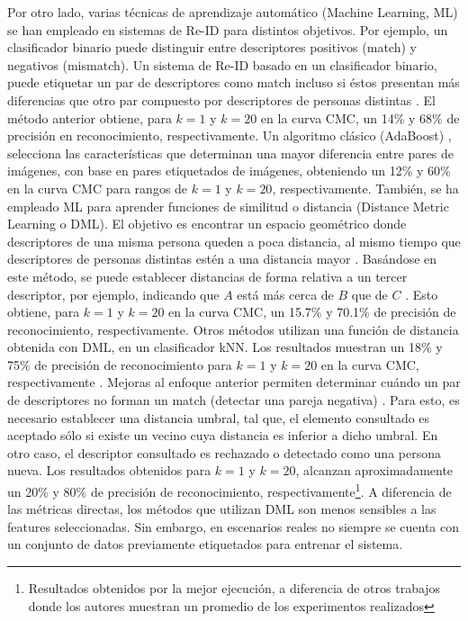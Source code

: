 \documentclass[../memoria.tex]{subfiles}
\begin{document}
Por otro lado, varias técnicas de aprendizaje automático (Machine Learning, ML) se han empleado en sistemas de Re-ID para distintos objetivos. Por ejemplo, un clasificador binario puede distinguir entre descriptores positivos (match) y negativos (mismatch). Un sistema de Re-ID basado en un clasificador binario, puede etiquetar un par de descriptores como match incluso si éstos presentan más diferencias que otro par compuesto por descriptores de personas distintas \cite{prosser2010person}. El método anterior obtiene, para $k=1$ y $k=20$ en la curva CMC, un 14\% y 68\% de precisión en reconocimiento, respectivamente. Un algoritmo clásico (AdaBoost) \cite{gray2008viewpoint}, selecciona las características que determinan una mayor diferencia entre pares de imágenes, con base en pares etiquetados de imágenes, obteniendo un 12\% y 60\% en la curva CMC para rangos de $k=1$ y $k=20$, respectivamente. También, se ha empleado ML para aprender funciones de similitud o distancia (Distance Metric Learning o DML). El objetivo es encontrar un espacio geométrico donde descriptores de una misma persona queden a poca distancia, al mismo tiempo que descriptores de personas distintas estén a una distancia mayor \cite{bellet2013survey}. Basándose en este método, se puede establecer distancias de forma relativa a un tercer descriptor, por ejemplo, indicando que $A$ está más cerca de $B$ que de $C$ \cite{zheng2013reidentification}. Esto obtiene, para $k=1$ y $k=20$ en la curva CMC, un 15.7\% y 70.1\% de precisión de reconocimiento, respectivamente.  Otros métodos \cite{weinberger2008fast} utilizan una función de distancia obtenida con DML, en un clasificador kNN. Los resultados muestran un 18\% y 75\% de precisión de reconocimiento para $k=1$ y $k=20$ en la curva CMC, respectivamente \cite{hirzer2012relaxed}. Mejoras al enfoque anterior permiten determinar cuándo un par de descriptores no forman un match (detectar una pareja negativa) \cite{dikmen2011pedestrian}. Para esto, es necesario establecer una distancia umbral, tal que, el elemento consultado es aceptado sólo si existe un vecino cuya distancia es inferior a dicho umbral. En otro caso, el descriptor consultado es rechazado o detectado como una persona nueva. Los resultados obtenidos para $k=1$ y $k=20$, alcanzan aproximadamente un 20\% y 80\% de precisión de reconocimiento, respectivamente\footnote{\label{lmnn-r}Resultados obtenidos por la mejor ejecución, a diferencia de otros trabajos donde los autores muestran un promedio de los experimentos realizados}. A diferencia de las métricas directas, los métodos que utilizan DML son menos sensibles a las features seleccionadas. Sin embargo, en escenarios reales no siempre se cuenta con un conjunto de datos previamente etiquetados para entrenar el sistema.
\end{document}
